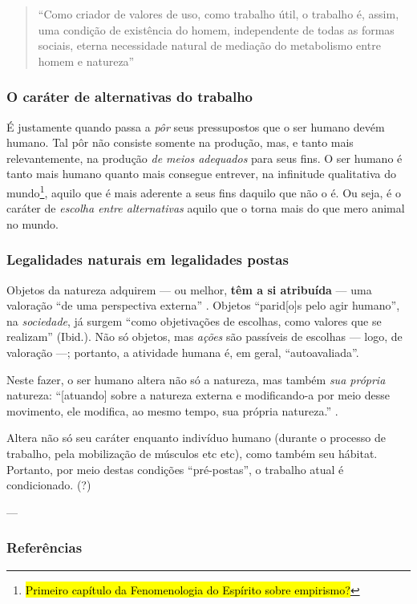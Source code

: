 \begin{quote}
``Como criador de valores de uso, como trabalho útil, o trabalho é, assim, uma condição de existência do homem, independente de todas as formas sociais, eterna necessidade natural de mediação do metabolismo entre homem e natureza'' \parencite[p. 120]{Marx2017}
\end{quote}

\subsubsection{O caráter de alternativas do trabalho}
É justamente quando passa a \textit{pôr} seus pressupostos que o ser humano devém humano. Tal pôr não consiste somente na produção, mas, e tanto mais relevantemente, na produção \textit{de meios adequados} para seus fins. O ser humano é tanto mais humano quanto mais consegue entrever, na infinitude qualitativa do mundo\footnote{\hl{Primeiro capítulo da Fenomenologia do Espírito sobre empirismo?}}, aquilo que é mais aderente a seus fins daquilo que não o é. Ou seja, é o caráter de \textit{escolha entre alternativas} aquilo que o torna mais do que mero animal no mundo. 

\subsubsection{Legalidades naturais em legalidades postas}
Objetos da natureza adquirem — ou melhor, \textbf{têm a si atribuída} — uma valoração ``de uma perspectiva externa'' \parencite[p 181]{Medeiros2016}. Objetos ``parid[o]s pelo agir humano'', na \textit{sociedade}, já surgem ``como objetivações de escolhas, como valores que se realizam'' (Ibid.). Não só objetos, mas \textit{ações} são passíveis de escolhas — logo, de valoração —; portanto, a atividade humana é, em geral, ``autoavaliada''.

Neste fazer, o ser humano altera não só a natureza, mas também \textit{sua própria} natureza: ``[atuando] sobre a natureza externa e modificando-a por meio desse movimento, ele modifica, ao mesmo tempo, sua própria natureza.'' \parencite[p. 255]{Marx2017}.

Altera não só seu caráter enquanto indivíduo humano (durante o processo de trabalho, pela mobilização de músculos etc etc), como também seu hábitat. Portanto, por meio destas condições ``pré-postas'', o trabalho atual é condicionado. (?)

---
\subsubsection{Referências}
